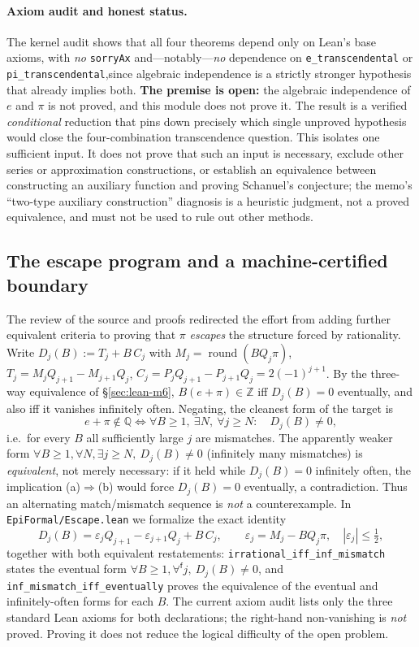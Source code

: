 \documentclass[11pt]{amsart}
\theoremstyle{definition}
\theoremstyle{remark}
\numberwithin{equation}{section}
\newcommand{\Q}{\mathbb{Q}}
\newcommand{\Z}{\mathbb{Z}}
\begin{document}
\paragraph{Axiom audit and honest status.} The kernel audit shows that all four theorems depend only on Lean's base axioms, with \emph{no} \texttt{sorryAx} and---notably---\emph{no} dependence on \texttt{e\_\allowbreak{}transcendental} or \texttt{pi\_\allowbreak{}transcendental},\allowbreak  since algebraic independence is a strictly stronger hypothesis that already implies both. \textbf{The premise is open:} the algebraic independence of $e$ and $\pi$ is not proved, and this module does not prove it. The result is a verified \emph{conditional} reduction that pins down precisely which single unproved hypothesis would close the four-combination transcendence question. This isolates one sufficient input. It does not prove that such an input is necessary, exclude other series or approximation constructions, or establish an equivalence between constructing an auxiliary function and proving Schanuel's conjecture; the memo's ``two-type auxiliary construction'' diagnosis is a heuristic judgment, not a proved equivalence, and must not be used to rule out other methods.

\subsection{The escape program and a machine-certified boundary}\label{sec:lean-escape}

The review of the source and proofs redirected the effort from adding further equivalent criteria to proving that $\pi$ \emph{escapes} the structure forced by rationality. Write $D_j(B):=T_j+B\,C_j$ with $M_j=\operatorname{round}(BQ_j\pi)$, $T_j=M_jQ_{j+1}-M_{j+1}Q_j$, $C_j=P_jQ_{j+1}-P_{j+1}Q_j=2(-1)^{j+1}$. By the three-way equivalence of \S\ref{sec:lean-m6}, $B(e+\pi)\in\Z$ iff $D_j(B)=0$ eventually, and also iff it vanishes infinitely often. Negating, the cleanest form of the target is
\[
e+\pi\notin\Q \iff \forall B\ge1,\ \exists N,\ \forall j\ge N:\quad D_j(B)\neq0,
\]
i.e.\ for every $B$ all sufficiently large $j$ are mismatches. The apparently weaker form $\forall B\ge1,\forall N,\exists j\ge N,\ D_j(B)\neq0$ (infinitely many mismatches) is \emph{equivalent}, not merely necessary: if it held while $D_j(B)=0$ infinitely often, the implication (a)$\Rightarrow$(b) would force $D_j(B)=0$ eventually, a contradiction. Thus an alternating match/mismatch sequence is \emph{not} a counterexample. In \texttt{EpiFormal/Escape.lean} we formalize the exact identity
\[
D_j(B)=\varepsilon_j Q_{j+1}-\varepsilon_{j+1}Q_j+B\,C_j,\qquad \varepsilon_j=M_j-BQ_j\pi,\quad|\varepsilon_j|\le\tfrac12,
\]
together with both equivalent restatements: \texttt{irrational\_iff\_inf\_mismatch} states the eventual form $\forall B\ge1,\forall^{\mathsf f}j,\ D_j(B)\neq0$, and \texttt{inf\_mismatch\_iff\_eventually} proves the equivalence of the eventual and infinitely-often forms for each $B$. The current axiom audit lists only the three standard Lean axioms for both declarations; the right-hand non-vanishing is \emph{not} proved. Proving it does not reduce the logical difficulty of the open problem.
\end{document}
